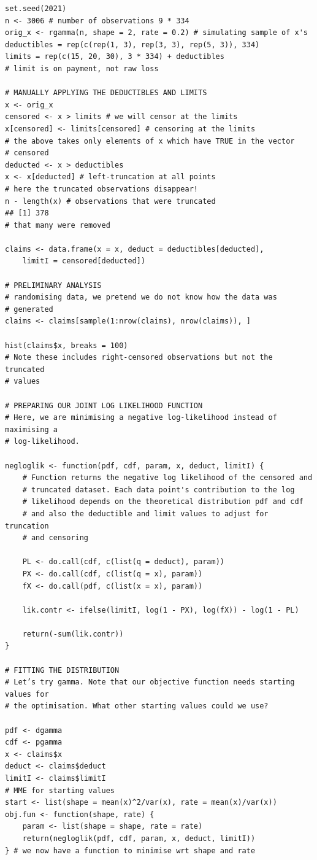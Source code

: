 \documentclass[11pt]{article}
\begin{document}
\begin{lstlisting}
set.seed(2021)
n <- 3006 # number of observations 9 * 334
orig_x <- rgamma(n, shape = 2, rate = 0.2) # simulating sample of x's
deductibles = rep(c(rep(1, 3), rep(3, 3), rep(5, 3)), 334)
limits = rep(c(15, 20, 30), 3 * 334) + deductibles
# limit is on payment, not raw loss

# MANUALLY APPLYING THE DEDUCTIBLES AND LIMITS
x <- orig_x
censored <- x > limits # we will censor at the limits
x[censored] <- limits[censored] # censoring at the limits
# the above takes only elements of x which have TRUE in the vector
# censored
deducted <- x > deductibles
x <- x[deducted] # left-truncation at all points
# here the truncated observations disappear!
n - length(x) # observations that were truncated
## [1] 378
# that many were removed

claims <- data.frame(x = x, deduct = deductibles[deducted],
    limitI = censored[deducted])

# PRELIMINARY ANALYSIS
# randomising data, we pretend we do not know how the data was
# generated
claims <- claims[sample(1:nrow(claims), nrow(claims)), ]

hist(claims$x, breaks = 100)
# Note these includes right-censored observations but not the truncated
# values

# PREPARING OUR JOINT LOG LIKELIHOOD FUNCTION
# Here, we are minimising a negative log-likelihood instead of maximising a
# log-likelihood.

negloglik <- function(pdf, cdf, param, x, deduct, limitI) {
    # Function returns the negative log likelihood of the censored and
    # truncated dataset. Each data point's contribution to the log
    # likelihood depends on the theoretical distribution pdf and cdf
    # and also the deductible and limit values to adjust for truncation
    # and censoring
    
    PL <- do.call(cdf, c(list(q = deduct), param))
    PX <- do.call(cdf, c(list(q = x), param))
    fX <- do.call(pdf, c(list(x = x), param))
    
    lik.contr <- ifelse(limitI, log(1 - PX), log(fX)) - log(1 - PL)
    
    return(-sum(lik.contr))
}

# FITTING THE DISTRIBUTION
# Let’s try gamma. Note that our objective function needs starting values for
# the optimisation. What other starting values could we use?

pdf <- dgamma
cdf <- pgamma
x <- claims$x
deduct <- claims$deduct
limitI <- claims$limitI
# MME for starting values
start <- list(shape = mean(x)^2/var(x), rate = mean(x)/var(x))
obj.fun <- function(shape, rate) {
    param <- list(shape = shape, rate = rate)
    return(negloglik(pdf, cdf, param, x, deduct, limitI))
} # we now have a function to minimise wrt shape and rate


\end{lstlisting}
\end{document}
